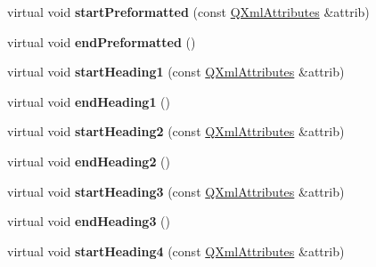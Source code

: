 \begin{DoxyCompactItemize}
\item 
\hypertarget{class_markup_handler_aed149f2dd750e7d4805f502ac7552b43}{virtual void {\bfseries start\-Preformatted} (const \hyperlink{class_q_xml_attributes}{Q\-Xml\-Attributes} \&attrib)}\label{class_markup_handler_aed149f2dd750e7d4805f502ac7552b43}

\item 
\hypertarget{class_markup_handler_a416fcc8eabff213fb9b80e385d6031fc}{virtual void {\bfseries end\-Preformatted} ()}\label{class_markup_handler_a416fcc8eabff213fb9b80e385d6031fc}

\item 
\hypertarget{class_markup_handler_a6c6397e2572235f15bbbce4f624cc00a}{virtual void {\bfseries start\-Heading1} (const \hyperlink{class_q_xml_attributes}{Q\-Xml\-Attributes} \&attrib)}\label{class_markup_handler_a6c6397e2572235f15bbbce4f624cc00a}

\item 
\hypertarget{class_markup_handler_a7a459781c3019c1ffdd231b1ea314bef}{virtual void {\bfseries end\-Heading1} ()}\label{class_markup_handler_a7a459781c3019c1ffdd231b1ea314bef}

\item 
\hypertarget{class_markup_handler_a834b7e8f26d2139f1af8fd036c19a083}{virtual void {\bfseries start\-Heading2} (const \hyperlink{class_q_xml_attributes}{Q\-Xml\-Attributes} \&attrib)}\label{class_markup_handler_a834b7e8f26d2139f1af8fd036c19a083}

\item 
\hypertarget{class_markup_handler_aa76a934299a9599a775dada256ba3e84}{virtual void {\bfseries end\-Heading2} ()}\label{class_markup_handler_aa76a934299a9599a775dada256ba3e84}

\item 
\hypertarget{class_markup_handler_a4bb025d00a30c7c09296a942ad7caf91}{virtual void {\bfseries start\-Heading3} (const \hyperlink{class_q_xml_attributes}{Q\-Xml\-Attributes} \&attrib)}\label{class_markup_handler_a4bb025d00a30c7c09296a942ad7caf91}

\item 
\hypertarget{class_markup_handler_a168b287ad3d75038f7f474538e58391f}{virtual void {\bfseries end\-Heading3} ()}\label{class_markup_handler_a168b287ad3d75038f7f474538e58391f}

\item 
\hypertarget{class_markup_handler_a8762f7a7a2f21117eb834f8b9afcb2bc}{virtual void {\bfseries start\-Heading4} (const \hyperlink{class_q_xml_attributes}{Q\-Xml\-Attributes} \&attrib)}\label{class_markup_handler_a8762f7a7a2f21117eb834f8b9afcb2bc}


\end{DoxyCompactItemize}
